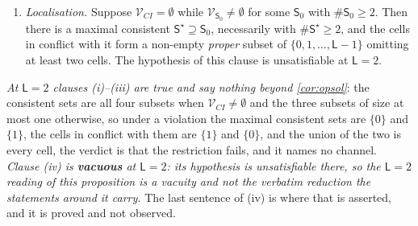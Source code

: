 \begin{proposition}
\begin{enumerate}
the reference set, and any rule for choosing one is a convention.
\item[(iv)] \emph{Localisation.} Suppose $\mathcal V_{CI}=\emptyset$ while
$\mathcal V_{\mathsf S_0}\neq\emptyset$ for some $\mathsf S_0$ with $\#\mathsf S_0\ge2$. Then there is a
maximal consistent $\mathsf S^{\star}\supseteq\mathsf S_0$, necessarily with
$\#\mathsf S^{\star}\ge2$, and the cells in conflict with it form a non-empty \emph{proper} subset of
$\{0,1,\dots,\mathsf L-1\}$ omitting at least two cells. The hypothesis of this clause is
unsatisfiable at $\mathsf L=2$.
\end{enumerate}
\emph{At $\mathsf L=2$ clauses \textup{(i)}--\textup{(iii)} are true and say nothing beyond
\cref{cor:opsol}}: the consistent sets are all four subsets when $\mathcal V_{CI}\neq\emptyset$ and the
three subsets of size at most one otherwise, so under a violation the maximal consistent sets are
$\{0\}$ and $\{1\}$, the cells in conflict with them are $\{1\}$ and $\{0\}$, and the union of the two is
every cell, the verdict is that the restriction fails, and it names no channel. \emph{Clause
\textup{(iv)} is \textbf{vacuous} at $\mathsf L=2$: its hypothesis is unsatisfiable there, so the
$\mathsf L=2$ reading of this proposition is a vacuity and not the verbatim reduction the statements
around it carry.} The last sentence of \textup{(iv)} is where that is asserted, and it is proved and not
observed.
\end{proposition}

